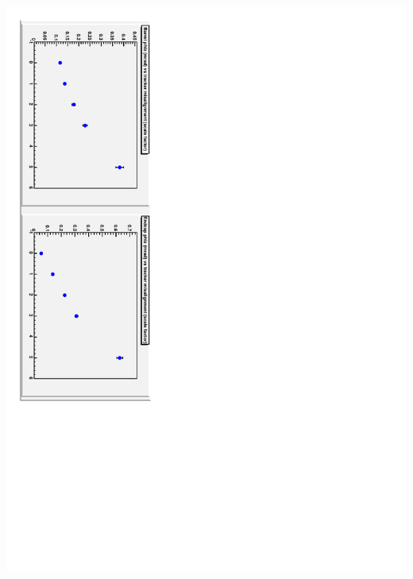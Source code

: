 \documentclass[compress]{beamer}
\begin{document}
\begin{frame}
\begin{columns}
\includegraphics[height=\linewidth, angle=90]{tracker_phiz_rmsonly.pdf}
\end{columns}
\end{frame}







\end{document}
